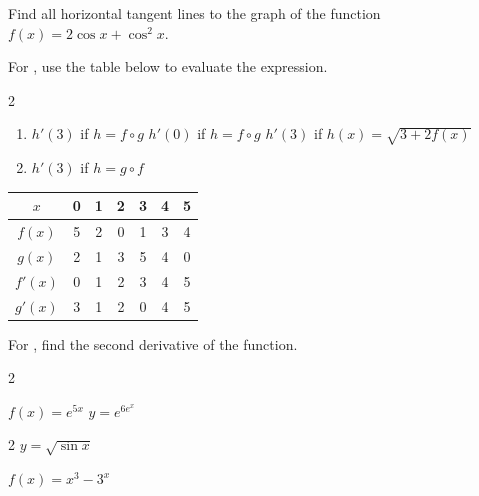 \documentclass{book}
\begin{document}
\begin{enumerate}[!HW!]
\itemspade Find all horizontal tangent lines to the graph of the function $f(x) = 2\cos x + \cos^2 x$. %
\end{enumerate}

For , use the table below to evaluate the expression.
\begin{multicols}{2}
\begin{enumerate}[!HW!]
\item \label{exer:chaintable:start} $h'(3)$ if $h=f\circ g$ %
\itemspade$h'(0)$ if $h=f\circ g$ %
\itemspade $h'(3)$ if $h(x)=\sqrt{3+2f(x)}$ %
\item\label{exer:chaintable:stop} $h'(3)$ if $h=g\circ f$ %
\end{enumerate}

\begin{center}
\begin{tabular}{c||c|c|c|c|c|c}
$x$ & 0 & 1 & 2 & 3 & 4 & 5\\\hline\hline
$f(x)$ & 5 & 2& 0& 1& 3& 4\\\hline
$g(x)$ & 2 & 1& 3& 5& 4& 0\\\hline
$f'(x)$ & 0 & 1& 2& 3& 4& 5\\\hline
$g'(x)$ & 3 & 1 & 2& 0& 4& 5
\end{tabular}
\end{center}
\end{multicols}

For , find the second derivative of the function.
\begin{enumerate}[!HW!]
\begin{multicols}{2}
\item \label{exer:secondchain:start} $f(x) = e^{5x}$ %
\itemspade $y=e^{6e^x}$ %
\end{multicols}
\begin{multicols}{2}
\itemspade $y=\sqrt{\sin x}$ %
\item \label{exer:secondchain:stop}  $f(x) = x^3-3^x$ %
\end{multicols}
\end{enumerate}
\end{document}
